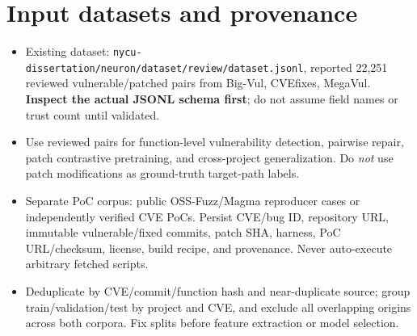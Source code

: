 \documentclass[10pt,a4paper]{article}
\begin{document}
\section{Input datasets and provenance}
\begin{itemize}
\item Existing dataset: \texttt{nycu-dissertation/neuron/dataset/review/dataset.jsonl}, reported 22,251 reviewed vulnerable/patched pairs from Big-Vul, CVEfixes, MegaVul. \textbf{Inspect the actual JSONL schema first}; do not assume field names or trust count until validated.
\item Use reviewed pairs for function-level vulnerability detection, pairwise repair, patch contrastive pretraining, and cross-project generalization. Do \emph{not} use patch modifications as ground-truth target-path labels.
\item Separate PoC corpus: public OSS-Fuzz/Magma reproducer cases or independently verified CVE PoCs. Persist CVE/bug ID, repository URL, immutable vulnerable/fixed commits, patch SHA, harness, PoC URL/checksum, license, build recipe, and provenance. Never auto-execute arbitrary fetched scripts.
\item Deduplicate by CVE/commit/function hash and near-duplicate source; group train/validation/test by project and CVE, and exclude all overlapping origins across both corpora. Fix splits before feature extraction or model selection.
\end{itemize}
\end{document}

